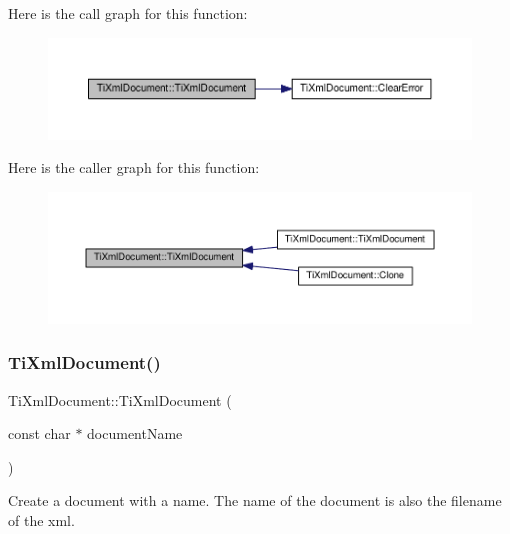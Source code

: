 Here is the call graph for this function\+:\nopagebreak
\begin{figure}[H]
\begin{center}
\leavevmode
\includegraphics[width=350pt]{class_ti_xml_document_a9f5e84335708fde98400230f9f12659c_cgraph}
\end{center}
\end{figure}
Here is the caller graph for this function\+:\nopagebreak
\begin{figure}[H]
\begin{center}
\leavevmode
\includegraphics[width=350pt]{class_ti_xml_document_a9f5e84335708fde98400230f9f12659c_icgraph}
\end{center}
\end{figure}
\mbox{\label{class_ti_xml_document_ae4508b452d0c3061db085f3db27b8396}} 
\subsubsection{\texorpdfstring{Ti\+Xml\+Document()}{TiXmlDocument()}\hspace{0.1cm}{\footnotesize\ttfamily [2/3]}}
{\footnotesize\ttfamily Ti\+Xml\+Document\+::\+Ti\+Xml\+Document (\begin{DoxyParamCaption}\item[{const char $\ast$}]{document\+Name }\end{DoxyParamCaption})}



Create a document with a name. The name of the document is also the filename of the xml. 

